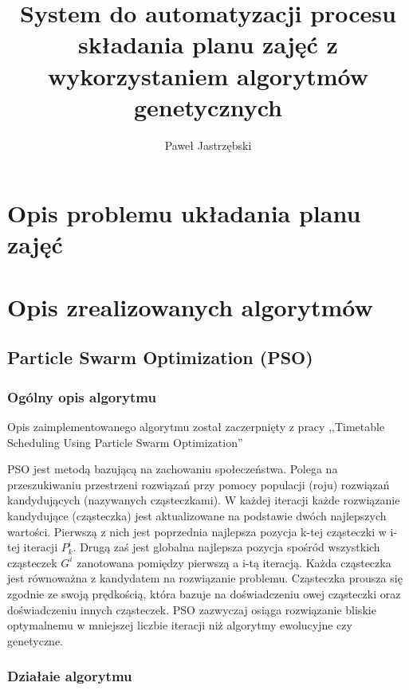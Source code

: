 \documentclass[11pt]{report}
\title{System do automatyzacji procesu składania planu zajęć z wykorzystaniem algorytmów genetycznych}
\begin{document}
%
%

\maketitle
\tableofcontents


\chapter{Opis problemu układania planu zajęć}





\chapter{Opis zrealizowanych algorytmów}


\section{Particle Swarm Optimization (PSO)}
\author{Paweł Jastrzębski}
\subsection{Ogólny opis algorytmu}
\par Opis zaimplementowanego algorytmu został zaczerpnięty z pracy ,,Timetable Scheduling Using Particle Swarm Optimization'' \cite{pso}
\par PSO jest metodą bazującą na zachowaniu społeczeństwa. Polega na przeszukiwaniu przestrzeni rozwiązań przy pomocy populacji (roju) rozwiązań kandydujących (nazywanych cząsteczkami). W każdej iteracji każde rozwiązanie kandydujące (cząsteczka) jest aktualizowane na podstawie dwóch najlepszych wartości. Pierwszą z nich jest poprzednia najlepsza pozycja k-tej cząsteczki w i-tej iteracji ${P}^{i}_{k}$. Drugą zaś jest globalna najlepsza pozycja spośród wszystkich cząsteczek ${G}^{i}$ zanotowana pomiędzy pierwszą a i-tą iteracją. Każda cząsteczka jest równoważna z kandydatem na rozwiązanie problemu. Cząsteczka prousza się zgodnie ze swoją prędkością, która bazuje na doświadczeniu owej cząsteczki oraz doświadczeniu innych cząsteczek. PSO zazwyczaj osiąga rozwiązanie bliskie optymalnemu w mniejszej liczbie iteracji niż algorytmy ewolucyjne czy genetyczne.  \subsection{Działaie algorytmu}
\end{document}
